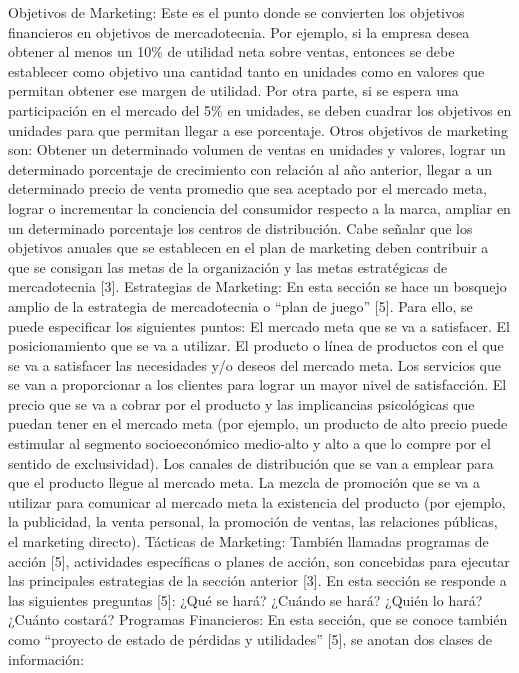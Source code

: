 \documentclass[
]{book}
\begin{document}
Objetivos de Marketing: Este es el punto donde se convierten los objetivos financieros en objetivos de mercadotecnia. Por ejemplo, si la empresa desea obtener al menos un 10\% de utilidad neta sobre ventas, entonces se debe establecer como objetivo una cantidad tanto en unidades como en valores que permitan obtener ese margen de utilidad. Por otra parte, si se espera una participación en el mercado del 5\% en unidades, se deben cuadrar los objetivos en unidades para que permitan llegar a ese porcentaje.
Otros objetivos de marketing son: Obtener un determinado volumen de ventas en unidades y valores, lograr un determinado porcentaje de crecimiento con relación al año anterior, llegar a un determinado precio de venta promedio que sea aceptado por el mercado meta, lograr o incrementar la conciencia del consumidor respecto a la marca, ampliar en un determinado porcentaje los centros de distribución.
Cabe señalar que los objetivos anuales que se establecen en el plan de marketing deben contribuir a que se consigan las metas de la organización y las metas estratégicas de mercadotecnia {[}3{]}.
Estrategias de Marketing: En esta sección se hace un bosquejo amplio de la estrategia de mercadotecnia o ``plan de juego'' {[}5{]}. Para ello, se puede especificar los siguientes puntos:
El mercado meta que se va a satisfacer.
El posicionamiento que se va a utilizar.
El producto o línea de productos con el que se va a satisfacer las necesidades y/o deseos del mercado meta.
Los servicios que se van a proporcionar a los clientes para lograr un mayor nivel de satisfacción.
El precio que se va a cobrar por el producto y las implicancias psicológicas que puedan tener en el mercado meta (por ejemplo, un producto de alto precio puede estimular al segmento socioeconómico medio-alto y alto a que lo compre por el sentido de exclusividad).
Los canales de distribución que se van a emplear para que el producto llegue al mercado meta.
La mezcla de promoción que se va a utilizar para comunicar al mercado meta la existencia del producto (por ejemplo, la publicidad, la venta personal, la promoción de ventas, las relaciones públicas, el marketing directo).
Tácticas de Marketing: También llamadas programas de acción {[}5{]}, actividades específicas o planes de acción, son concebidas para ejecutar las principales estrategias de la sección anterior {[}3{]}. En esta sección se responde a las siguientes preguntas {[}5{]}:
¿Qué se hará?
¿Cuándo se hará?
¿Quién lo hará?
¿Cuánto costará?
Programas Financieros: En esta sección, que se conoce también como ``proyecto de estado de pérdidas y utilidades'' {[}5{]}, se anotan dos clases de información:
\end{document}
